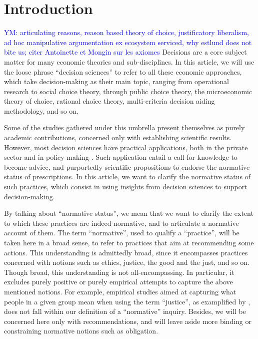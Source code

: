 \documentclass[preprint, french, english, 11pt, authoryear]{elsarticle}%
\newcommand{\commentYM}[1]{\textcolor{blue}{YM: #1}}
\begin{document}
\section{Introduction}
\commentYM{articulating reasons, reason based theory of choice, justificatory liberalism, ad hoc manipulative argumentation ex ecosystem serviced, why estlund does not bite us; citer Antoinette et Mongin sur les axiomes}
Decisions are a core subject matter for many economic theories and sub-disciplines. In this article, we will use the loose phrase ``decision sciences'' to refer to all these economic approaches, which take decision-making as their main topic, ranging from operational research to social choice theory, through public choice theory, the microeconomic theory of choice, rational choice theory, multi-criteria decision aiding methodology, and so on.

Some of the studies gathered under this umbrella present themselves as purely academic contributions, concerned only with establishing scientific results. However, most decision sciences have practical applications, both in the private sector and in policy-making \citet{tsoukias_policy_2013,marchi_evidence-based_2016}. Such application entail a call for knowledge to become advice, and purportedly scientific propositions to endorse the normative status of prescriptions. 
In this article, we want to clarify the normative status of such practices, which consist in using insights from decision sciences to support decision-making.

By talking about ``normative status'', we mean that we want to clarify the extent to which these practices are indeed normative, and to articulate a normative account of them. 
The term ``normative'', used to qualify a “practice”, will be taken here in a broad sense, to refer to practices that aim at recommending some actions. This understanding is admittedly broad, since it encompasses practices concerned with notions such as ethics, justice, the good and the just, and so on. 
Though broad, this understanding is not all-encompassing. In particular, it excludes purely positive or purely empirical attempts to capture the above mentioned notions. For example, empirical studies aimed at capturing what people in a given group mean when using the term ``justice'', as examplified by \citet{gaertner_empirical_2012}, does not fall within our definition of a ``normative'' inquiry. Besides, we will be concerned here only with recommendations, and will leave aside more binding or constraining normative notions such as obligation.
\end{document}
